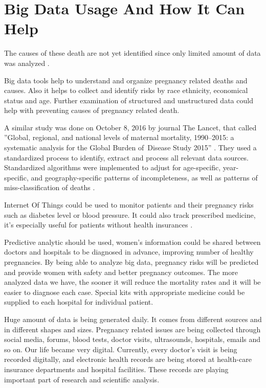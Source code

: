 \documentclass[sigconf]{acmart}
\begin{document}
\section{Big Data Usage And How It Can Help}

The causes of these death are not yet identified since only limited amount of data was analyzed \cite{creanga2012race}.

Big data tools help to understand and organize pregnancy related deaths and causes. Also it helps to collect and identify risks by race ethnicity, economical status and age. Further examination of structured and unstructured data could help with preventing causes of pregnancy related death.

A similar study was done on October 8, 2016 by  journal The Lancet, that called ''Global, regional, and national levels of maternal mortality, 1990–2015: a systematic analysis for the Global Burden of Disease Study 2015'' \cite{kassebaum2016global}. They used a standardized process to identify, extract and process all relevant data sources. Standardized algorithms were implemented to adjust for age-specific, year-specific, and geography-specific patterns of incompleteness, as well as patterns of miss-classification of deaths \cite{mcginnis2013best}.

Internet Of Things could be used to  monitor patients and their pregnancy risks  such as diabetes level or blood pressure. It could also track prescribed medicine, it’s especially useful for patients without health insurances \cite{kassebaum2016global}. 

Predictive analytic should be used, women’s information could be shared between doctors and hospitals to be diagnosed in advance, improving number of healthy pregnancies. By being able to analyze big data, pregnancy risks will be predicted and provide women with safety and better pregnancy outcomes. The more analyzed data we have, the sooner it will reduce the mortality rates and it will be easier to diagnose each case. Special kits with appropriate medicine could be supplied to each hospital for individual patient.

Huge amount of data is being generated daily. It comes from different sources and in different shapes and sizes. Pregnancy related issues are being collected through social media, forums, blood tests, doctor visits, ultrasounds, hospitals, emails and so on. Our life became very digital. Currently, every doctor’s visit is being recorded digitally, and electronic health records are being stored at health-care insurance departments and hospital facilities. These records are playing important part of research and scientific analysis.
\end{document}
